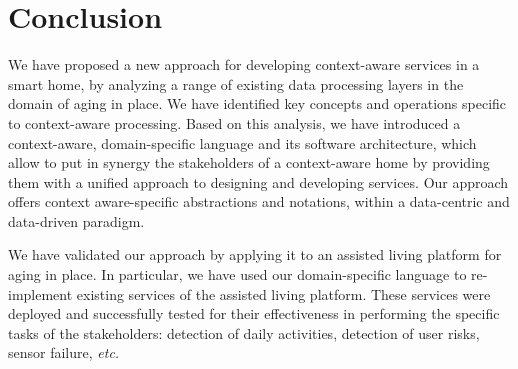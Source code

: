 \section{Conclusion}

We have proposed a new approach for developing context-aware services in a smart home, by
analyzing a range of existing data processing layers in the domain of aging in place. We have identified key concepts and operations specific to context-aware processing. Based on this analysis, we have introduced a context-aware, domain-specific language and its software architecture, which allow to put in synergy the stakeholders of a context-aware home by providing them with a unified approach to designing and developing services. Our approach offers context aware-specific abstractions and notations, within a data-centric and data-driven paradigm.

We have validated our approach by applying it to an assisted living platform for aging in place. In particular, we have used our domain-specific language to re-implement existing services of the assisted living platform. These services were deployed and successfully tested for their effectiveness in performing the specific tasks of the stakeholders: detection of daily activities, detection of user risks, sensor failure, {\em etc.}
